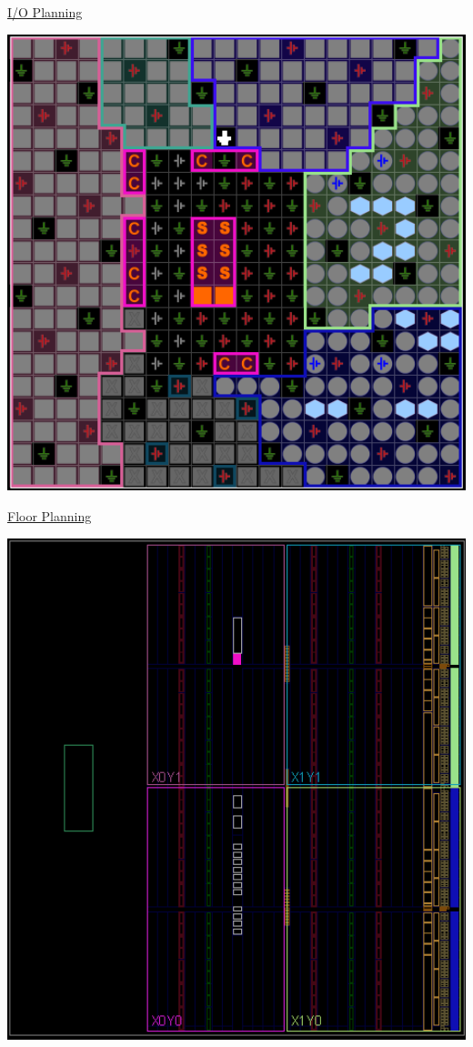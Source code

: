 \documentclass[11pt]{article}
\begin{document}
\begin{center}
    \newpage

    \underline{I/O Planning}

    \includegraphics[width = 1\textwidth]{IOPlan.png}

    \newpage

    \underline{Floor Planning}

    \includegraphics[width = 1\textwidth]{FloorPlan.png}


\end{center}
\end{document}
